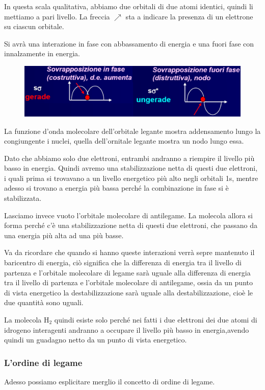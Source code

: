 In questa scala qualitativa, abbiamo due orbitali di due atomi identici, quindi li mettiamo a pari livello. La freccia $\nearrow$ sta a indicare la presenza di un elettrone su ciascun orbitale.

Si avrà una interazione in fase con abbassamento di energia e una fuori fase con innalzamente in energia.

\begin{figure}[htp]
    \centering
    \includegraphics[width=12cm]{immagini/sovrapposizione_in_fase_e_fuori_fase.png}
\end{figure}

La funzione d'onda molecolare dell'orbitale legante mostra addensamento lungo la congiungente i nuclei, quella dell'ornitale legante mostra un nodo lungo essa.

\vspace{0.2cm}Dato che abbiamo solo due elettroni, entrambi andranno a riempire il livello più basso in energia. Quindi avremo una stabilizzazione netta di questi due elettroni, i quali prima si trovavano a un livello energetico più alto negli orbitali 1s, mentre adesso si trovano a energia più bassa perché la combinazione in fase si è stabilizzata.

Lasciamo invece vuoto l'orbitale molecolare di antilegame.
La molecola allora si forma perché c'è una stabilizzazione netta di questi due elettroni, che passano da una energia più alta ad una più basse.

Va da ricordare che quando si hanno queste interazioni verrà sepre mantenuto il baricentro di energia, ciò significa che la differenza di energia tra il livello di partenza e l'orbitale molecolare di legame sarà uguale alla differenza di energia tra il livello di partenza e l'orbitale molecolare di antilegame, ossia da un punto di vista energetico la destabilizzazione sarà uguale alla destabilizzazione, cioè le due quantità sono uguali.

La molecola H$_2$ quindi esiste solo perché nei fatti i due elettroni dei due atomi di idrogeno interagenti andranno a occupare il livello più basso in energia,avendo quindi un guadagno netto da un punto di vista energetico.

\subsubsection{L'ordine di legame}
Adesso possiamo esplicitare merglio il concetto di ordine di legame.

